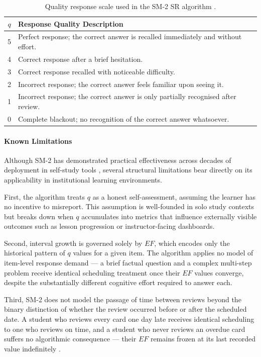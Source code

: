 \begin{table}[H]
\centering
\small
\renewcommand{\arraystretch}{1.3}
\caption{Quality response scale used in the SM-2 SR algorithm \cite{wozniak1998sm2}.}
\begin{tabular}{|c|p{11cm}|}
\hline
\textbf{$q$} & \textbf{Response Quality Description} \\
\hline
5 & Perfect response; the correct answer is recalled immediately 
    and without effort. \\
\hline
4 & Correct response after a brief hesitation. \\
\hline
3 & Correct response recalled with noticeable difficulty. \\
\hline
2 & Incorrect response; the correct answer feels familiar upon 
    seeing it. \\
\hline
1 & Incorrect response; the correct answer is only partially 
    recognised after review. \\
\hline
0 & Complete blackout; no recognition of the correct answer 
    whatsoever. \\
\hline
\end{tabular}
\label{tab:sm2_quality_scale}
\end{table}

\paragraph{Known Limitations}
Although SM-2 has demonstrated practical effectiveness across decades of deployment in self-study tools \cite{kornell2009}, several structural limitations bear directly on its applicability in institutional learning environments.

First, the algorithm treats $q$ as a honest self-assessment, assuming the learner has no incentive to misreport. This assumption is well-founded in solo study contexts but breaks down when $q$ accumulates into metrics that influence externally visible outcomes such as lesson progression or instructor-facing dashboards.

Second, interval growth is governed solely by $EF$, which encodes only the historical pattern of $q$ values for a given item. The algorithm applies no model of item-level response demand — a brief factual question and a complex multi-step problem receive identical scheduling treatment once their $EF$ values converge, despite the substantially different cognitive effort required to answer each.

Third, SM-2 does not model the passage of time between reviews beyond the binary distinction of whether the review occurred before or after the scheduled date. A student who reviews every card one day late receives identical scheduling to one who reviews on time, and a student who never reviews an overdue card suffers no algorithmic consequence — their $EF$ remains frozen at its last recorded value indefinitely \cite{wozniak1998sm2}.

